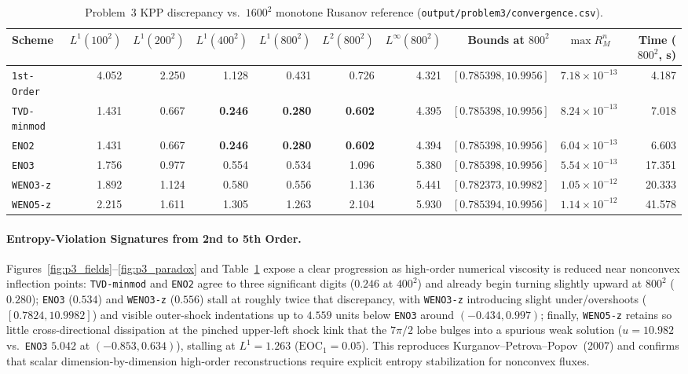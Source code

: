 \documentclass[11pt,a4paper]{article}
\newcommand{\code}[1]{\texttt{#1}}
\theoremstyle{definition}
\begin{document}
\begin{table}[h]
\centering\scriptsize\setlength{\tabcolsep}{3.1pt}
\caption{Problem~3 KPP discrepancy vs.\ $1600^2$ monotone Rusanov reference (\code{output/problem3/convergence.csv}).}
\label{tab:p3}
\begin{tabular}{@{}lrrrrrrrcr@{}}
\toprule
\textbf{Scheme} & $L^1(100^2)$ & $L^1(200^2)$ & $L^1(400^2)$ & $L^1(800^2)$ & $L^2(800^2)$ & $L^\infty(800^2)$ & \textbf{Bounds at} $800^2$ & $\max R_M^n$ & \textbf{Time ($800^2$, s)} \\
\midrule
\code{1st-Order}  & 4.052 & 2.250 & 1.128 & 0.431 & 0.726 & 4.321 & $[0.785398, 10.9956]$ & $7.18\times 10^{-13}$ & 4.187 \\
\code{TVD-minmod} & 1.431 & 0.667 & \textbf{0.246} & \textbf{0.280} & \textbf{0.602} & 4.395 & $[0.785398, 10.9956]$ & $8.24\times 10^{-13}$ & 7.018 \\
\code{ENO2}       & 1.431 & 0.667 & \textbf{0.246} & \textbf{0.280} & \textbf{0.602} & 4.394 & $[0.785398, 10.9956]$ & $6.04\times 10^{-13}$ & 6.603 \\
\code{ENO3}       & 1.756 & 0.977 & 0.554 & 0.534 & 1.096 & 5.380 & $[0.785398, 10.9956]$ & $5.54\times 10^{-13}$ & 17.351 \\
\code{WENO3-z}    & 1.892 & 1.124 & 0.580 & 0.556 & 1.136 & 5.441 & $[0.782373, 10.9982]$ & $1.05\times 10^{-12}$ & 20.333 \\
\code{WENO5-z}    & 2.215 & 1.611 & 1.305 & 1.263 & 2.104 & 5.930 & $[0.785394, 10.9956]$ & $1.14\times 10^{-12}$ & 41.578 \\
\bottomrule
\end{tabular}
\end{table}

\paragraph{Entropy-Violation Signatures from 2nd to 5th Order.}
Figures~\ref{fig:p3_fields}--\ref{fig:p3_paradox} and Table~\ref{tab:p3} expose a clear progression as high-order numerical viscosity is reduced near nonconvex inflection points: \code{TVD-minmod} and \code{ENO2} agree to three significant digits ($0.246$ at $400^2$) and already begin turning slightly upward at $800^2$ ($0.280$); \code{ENO3} ($0.534$) and \code{WENO3-z} ($0.556$) stall at roughly twice that discrepancy, with \code{WENO3-z} introducing slight under/overshoots ($[0.7824, 10.9982]$) and visible outer-shock indentations up to $4.559$ units below \code{ENO3} around $(-0.434, 0.997)$; finally, \code{WENO5-z} retains so little cross-directional dissipation at the pinched upper-left shock kink that the $7\pi/2$ lobe bulges into a spurious weak solution ($u=10.982$ vs.\ \code{ENO3} $5.042$ at $(-0.853, 0.634)$), stalling at $L^1=1.263$ ($\mathrm{EOC}_1=0.05$). This reproduces Kurganov--Petrova--Popov~(2007) and confirms that scalar dimension-by-dimension high-order reconstructions require explicit entropy stabilization for nonconvex fluxes.
\end{document}

